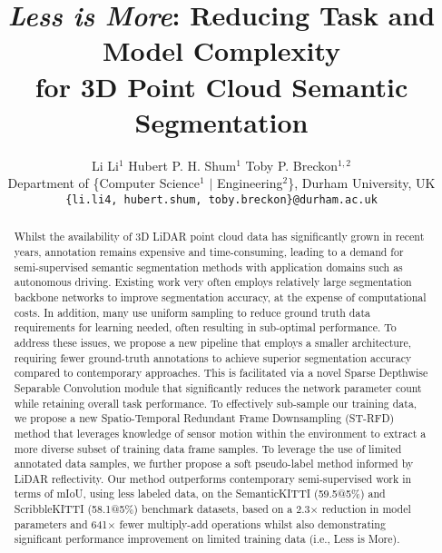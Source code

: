 \documentclass[10pt,twocolumn,letterpaper]{article}
\begin{document}
\title{\vspace{-0.85cm}
\textit{Less is More}: Reducing Task and Model Complexity \\ for 3D Point Cloud Semantic Segmentation
\vspace{-0.55cm}}

\author{Li Li$^1$ \qquad Hubert P. H. Shum$^1$ \qquad Toby P. Breckon$^{1,2}$\\
	Department of \{Computer Science$^{1}$ $|$ Engineering$^{2}$\}, Durham University, UK\\
	{\tt\small \{li.li4,\ hubert.shum,\ toby.breckon\}@durham.ac.uk}}

\maketitle 

\newcommand{\ourmodel}{LiM3D}
\newcommand{\ourmodelsdsc}{LiM3D+SDSC}
\newcommand{\samplfull}{Spatio-Temporal Redundant Frame Downsampling}
\newcommand{\samplshort}{ST-RFD}
\newcommand{\ourupl}{Voxel $\text{U}^2\text{PL}$}
\newcommand{\validset}{\textit{validation} set}
\newcommand{\trainset}{\textit{training} set}
\newcommand{\testset}{\textit{test} set}
 \begin{abstract}
    \vspace{-0.2cm}   
    \noindent
    Whilst the availability of 3D LiDAR point cloud data has significantly grown in recent years, annotation remains expensive and time-consuming, leading to a demand for semi-supervised semantic segmentation methods with application domains such as autonomous driving. Existing work very often employs relatively large segmentation backbone networks to improve segmentation accuracy, at the expense of computational costs. In addition, many use uniform sampling to reduce ground truth data requirements for learning needed, often resulting in sub-optimal performance. To address these issues, we propose a new pipeline that employs a smaller architecture, requiring fewer ground-truth annotations to achieve superior segmentation accuracy compared to contemporary approaches. This is facilitated via a novel Sparse Depthwise Separable Convolution module that significantly reduces the network parameter count while retaining overall task performance. To effectively sub-sample our training data, we propose a new {\samplfull} ({\samplshort}) method that leverages knowledge of sensor motion within the environment to extract a more diverse subset of training data frame samples. To leverage the use of limited annotated data samples, we further propose a soft pseudo-label method informed by LiDAR reflectivity. Our method outperforms contemporary semi-supervised work in terms of mIoU, using less labeled data, on the SemanticKITTI (59.5@5\%) and ScribbleKITTI (58.1@5\%) benchmark datasets, based on a 2.3$\times$ reduction in model parameters and 641$\times$ fewer multiply-add operations whilst also demonstrating significant performance improvement on limited training data (i.e., Less is More).

    
    \vspace{-0.5cm}
\end{abstract} \vspace{-0.3cm}   
\end{document}
